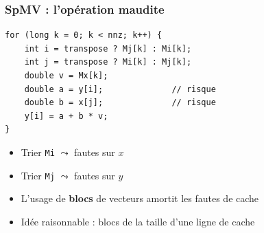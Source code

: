 \documentclass[xcolor={x11names,svgnames}]{beamer}
\newcommand{\red}[1]{{\color{red}#1}}
\begin{document}

\begin{frame}[fragile]
  \frametitle{SpMV : l'opération maudite}

\begin{verbatim}
for (long k = 0; k < nnz; k++) {
    int i = transpose ? Mj[k] : Mi[k];
    int j = transpose ? Mi[k] : Mj[k];
    double v = Mx[k];
    double a = y[i];              // risque
    double b = x[j];              // risque
    y[i] = a + b * v;
}
\end{verbatim}

  \begin{itemize}
  \item Trier \texttt{Mi} $\leadsto$ fautes sur $x$
  \item Trier \texttt{Mj} $\leadsto$ fautes sur $y$    
  \item L'usage de \textbf{blocs} de vecteurs \red{amortit} les fautes de cache
  \item Idée \og raisonnable\fg{} : blocs de la taille d'une ligne de cache
  \end{itemize}
\end{frame}

\end{document}
